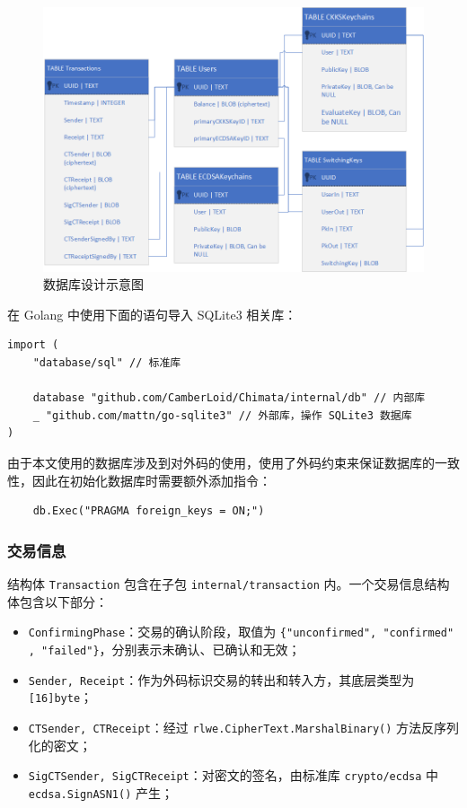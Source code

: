 \begin{figure}[ht]
    \centering
    \includegraphics[width=\linewidth]{Figures/chimata-database-design.png}
    \caption{数据库设计示意图}\label{Fig:Database}
\end{figure}

在 Golang 中使用下面的语句导入 SQLite3 相关库：

\begin{verbatim}
import (
    "database/sql" // 标准库
    
    database "github.com/CamberLoid/Chimata/internal/db" // 内部库
    _ "github.com/mattn/go-sqlite3" // 外部库，操作 SQLite3 数据库
)
\end{verbatim}

由于本文使用的数据库涉及到对外码的使用，使用了外码约束来保证数据库的一致性，因此在初始化数据库时需要额外添加指令：

\begin{verbatim}
    db.Exec("PRAGMA foreign_keys = ON;")
\end{verbatim}

\subsubsection*{交易信息}

结构体 \verb|Transaction| 包含在子包 \verb|internal/transaction| 内。一个交易信息结构体包含以下部分：

\begin{itemize}
    \item \verb|ConfirmingPhase|：交易的确认阶段，取值为 \verb|{"unconfirmed", "confirmed"|\\
    \verb|, "failed"}|，分别表示未确认、已确认和无效；
    \item \verb|Sender, Receipt|：作为外码标识交易的转出和转入方，其底层类型为 \verb|[16]byte|；
    \item \verb|CTSender, CTReceipt|：经过 \verb|rlwe.CipherText.MarshalBinary()| 方法反序列化的密文；
    \item \verb|SigCTSender, SigCTReceipt|：对密文的签名，由标准库 \verb|crypto/ecdsa| 中 \verb|ecdsa.SignASN1()| 产生；
\end{itemize}

